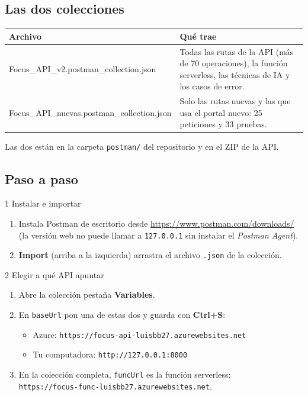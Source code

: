 \documentclass[11pt,a4paper]{article}
\newcommand{\menu}[1]{\textsf{\textbf{#1}}}
\begin{document}
\subsection{Las dos colecciones}
\begin{center}
\renewcommand{\arraystretch}{1.25}
\begin{tabularx}{\textwidth}{>{\ttfamily\raggedright\arraybackslash}p{5.2cm} X}
\toprule
\normalfont\bfseries Archivo & \textbf{Qué trae} \\
\midrule
Focus\_API\_v2\newline .postman\_collection.json & Todas las rutas de la API (más de 70 operaciones), la función serverless, las técnicas de IA y los casos de error. \\
Focus\_API\_nuevas\newline .postman\_collection.json & Solo las rutas nuevas y las que usa el portal nuevo: 25 peticiones y 33 pruebas. \\
\bottomrule
\end{tabularx}
\end{center}
Las dos están en la carpeta \texttt{postman/} del repositorio y en el ZIP de la API.

\subsection{Paso a paso}
\begin{paso}{1 \textperiodcentered{} Instalar e importar}
\begin{enumerate}[leftmargin=*]
  \item Instala Postman de escritorio desde \url{https://www.postman.com/downloads/} (la versión web
        no puede llamar a \texttt{127.0.0.1} sin instalar el \emph{Postman Agent}).
  \item \menu{Import} (arriba a la izquierda) \textrightarrow{} arrastra el archivo \texttt{.json} de la colección.
\end{enumerate}
\end{paso}

\begin{paso}{2 \textperiodcentered{} Elegir a qué API apuntar}
\begin{enumerate}[leftmargin=*]
  \item Abre la colección \textrightarrow{} pestaña \menu{Variables}.
  \item En \texttt{baseUrl} pon una de estas dos y guarda con \menu{Ctrl+S}:
    \begin{itemize}
      \item Azure: \texttt{https://focus-api-luisbb27.azurewebsites.net}
      \item Tu computadora: \texttt{http://127.0.0.1:8000}
    \end{itemize}
  \item En la colección completa, \texttt{funcUrl} es la función serverless:\\
        \texttt{https://focus-func-luisbb27.azurewebsites.net}.
\end{enumerate}
\end{paso}
\end{document}
